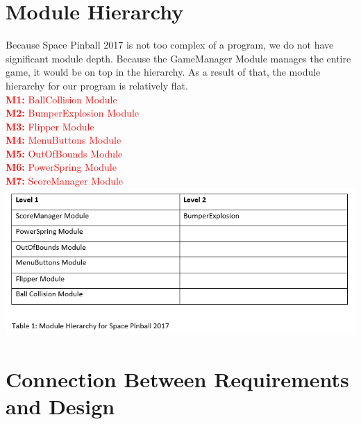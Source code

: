 \documentclass[12pt, titlepage]{article}
\begin{document}
\section{Module Hierarchy} \label{SecMH}

Because Space Pinball 2017 is not too complex of a program, we do not have significant module depth. Because the GameManager Module manages the entire game, it would be on top in the hierarchy. As a result of that, the module hierarchy for our program is relatively flat.\\

\textcolor{red}{\textbf{M1:} BallCollision Module}\\

\textcolor{red}{\textbf{M2:} BumperExplosion Module}\\

\textcolor{red}{\textbf{M3:} Flipper Module}\\

\textcolor{red}{\textbf{M4:} MenuButtons Module}\\

\textcolor{red}{\textbf{M5:} OutOfBounds Module}\\

\textcolor{red}{\textbf{M6:} PowerSpring Module}\\

\textcolor{red}{{\textbf{M7:} ScoreManager Module}}\\

\includegraphics[scale=0.9]{1.png}

\section{Connection Between Requirements and Design} \label{SecConnection}
\end{document}
